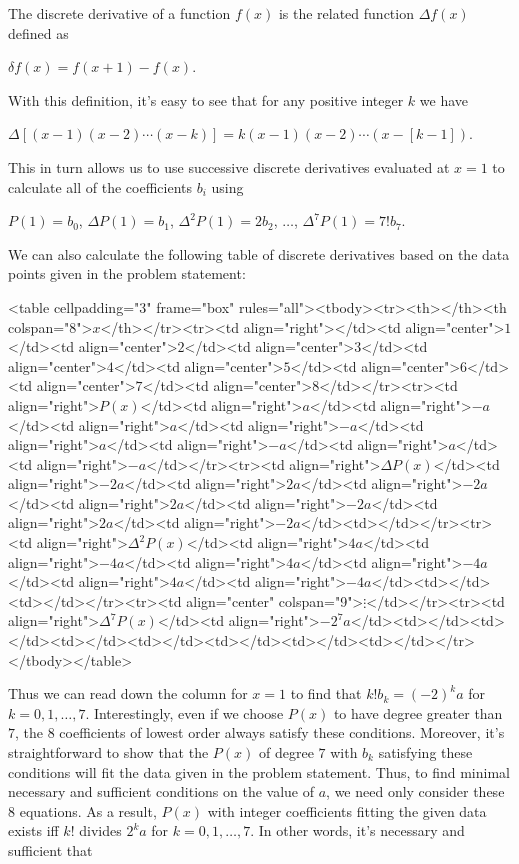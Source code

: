 \begin{enumerate}
 The discrete derivative of a function $f(x)$ is the related function $\Delta f(x)$ defined as

 $\delta f(x) = f(x+1) - f(x)$.

 With this definition, it's easy to see that for any positive integer $k$ we have

 $\Delta [(x-1)(x-2)\cdots(x-k)] = k(x-1)(x-2)\cdots(x-[k-1])$.

 This in turn allows us to use successive discrete derivatives evaluated at $x=1$ to calculate all of the coefficients $b_i$ using

 $P(1) = b_0$, $\Delta P(1) = b_1$, $\Delta^2 P(1) = 2 b_2$, $\ldots$, $\Delta^7 P(1) = 7! b_7$.

 We can also calculate the following table of discrete derivatives based on the data points given in the problem statement:

 <table cellpadding="3" frame="box" rules="all"><tbody><tr><th></th><th colspan="8">$x$</th></tr><tr><td align="right"></td><td align="center">$1$</td><td align="center">$2$</td><td align="center">$3$</td><td align="center">$4$</td><td align="center">$5$</td><td align="center">$6$</td><td align="center">$7$</td><td align="center">$8$</td></tr><tr><td align="right">$P(x)$</td><td align="right">$a$</td><td align="right">$-a$</td><td align="right">$a$</td><td align="right">$-a$</td><td align="right">$a$</td><td align="right">$-a$</td><td align="right">$a$</td><td align="right">$-a$</td></tr><tr><td align="right">$\Delta P(x)$</td><td align="right">$-2a$</td><td align="right">$2a$</td><td align="right">$-2a$</td><td align="right">$2a$</td><td align="right">$-2a$</td><td align="right">$2a$</td><td align="right">$-2a$</td><td></td></tr><tr><td align="right">$\Delta^2 P(x)$</td><td align="right">$4a$</td><td align="right">$-4a$</td><td align="right">$4a$</td><td align="right">$-4a$</td><td align="right">$4a$</td><td align="right">$-4a$</td><td></td><td></td></tr><tr><td align="center" colspan="9">$\vdots$</td></tr><tr><td align="right">$\Delta^7 P(x)$</td><td align="right">$-2^7 a$</td><td></td><td></td><td></td><td></td><td></td><td></td><td></td></tr></tbody></table>

 Thus we can read down the column for $x=1$ to find that $k! b_k = (-2)^k a$ for $k = 0, 1, \ldots, 7$.  Interestingly, even if we choose $P(x)$ to have degree greater than $7$, the $8$ coefficients of lowest order always satisfy these conditions.  Moreover, it's straightforward to show that the $P(x)$ of degree $7$ with $b_k$ satisfying these conditions will fit the data given in the problem statement.  Thus, to find minimal necessary and sufficient conditions on the value of $a$, we need only consider these $8$ equations.  As a result, $P(x)$ with integer coefficients fitting the given data exists iff $k!$ divides $2^k a$ for $k = 0, 1, \ldots, 7$.  In other words, it's necessary and sufficient that


\end{enumerate}
